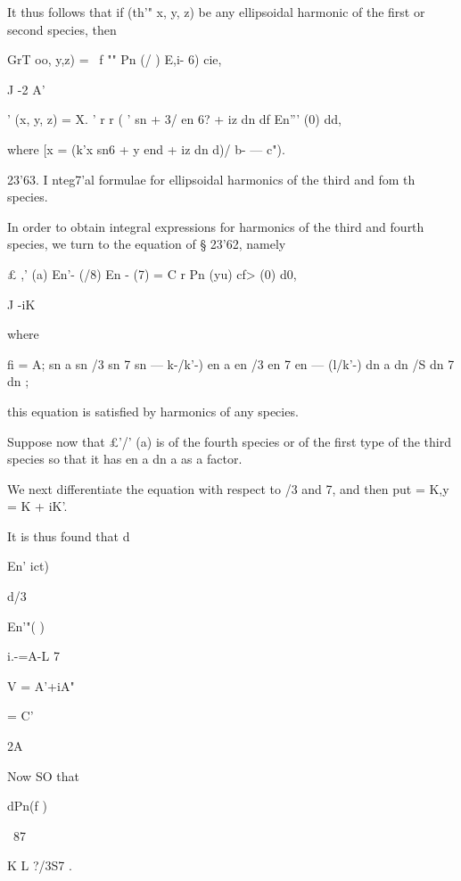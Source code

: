 {{{{{{{{It thus follows that if (th'"  x, y, z) be any ellipsoidal harmonic of the first 
or second species, then 

GrT  oo, y,z) = \ f "" Pn (/ ) E,i-  6) cie, 

J -2 A' 

  '  (x, y, z) = X.  ' r r ( '  sn   + 3/ en 6? + iz dn df En''' (0) dd, 

where [x = (k'x sn6 + y end + iz dn d)/\/ b- — c"). 

23'63. I nteg7'al formulae for ellipsoidal harmonics of the third and fom th 
species. 

In order to obtain integral expressions for harmonics of the third and 
fourth species, we turn to the equation of § 23'62, namely 

£ ,'  (a) En'- (/8) En - (7) = C r Pn (yu) cf> (0) d0, 

J -iK 

where 

fi = A; sn a sn /3 sn 7 sn   —  k-/k'-) en a en /3 en 7 en   — (l/k'-) dn a dn /S dn 7 dn   ; 

this equation is satisfied by harmonics of any species. 

Suppose now that £'/'  (a) is of the fourth species or of the first type of 
the third species so that it has en a dn a as a factor. 

We next differentiate the equation with respect to /3 and 7, and then put 
  = K,y = K + iK'. 

It is thus found that 
d 



En' ict) 



d/3 



En'"( ) 



i.-=A-L 7 



V = A'+iA" 



= C' 



2A 



Now 
SO that 



dPn(f ) 

\  87 \  



K L ?/3S7 . 



}}}}}}}}
